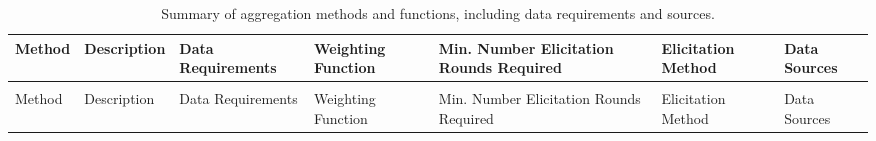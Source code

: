 \documentclass[
  11pt,
  a4paper,
]{article}
\begin{document}
\begin{longtable}[l]{>{\raggedright\arraybackslash}p{10em}>{\raggedright\arraybackslash}p{20em}>{\raggedright\arraybackslash}p{15em}>{\raggedright\arraybackslash}p{15em}>{\raggedright\arraybackslash}p{5em}>{\raggedright\arraybackslash}p{20em}>{\raggedright\arraybackslash}p{10em}}

\caption{\label{tbl-method-summary-table}Summary of aggregation methods
and functions, including data requirements and sources.}

\tabularnewline

\toprule
Method & Description & Data Requirements & Weighting Function & Min. Number Elicitation Rounds Required & Elicitation Method & Data Sources\\
\midrule
\endfirsthead
\multicolumn{7}{@{}l}{\textit{(continued)}}\\
\toprule
Method & Description & Data Requirements & Weighting Function & Min. Number Elicitation Rounds Required & Elicitation Method & Data Sources\\
\midrule
\endhead


\end{longtable}
\end{document}
